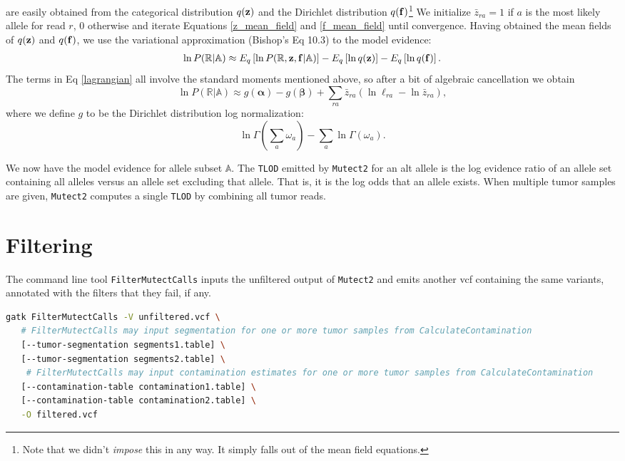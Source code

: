 \documentclass[nofootinbib,amssymb,amsmath]{revtex4}
\newcommand{\vf}{{\bf f}}
\newcommand{\vz}{{\bf z}}
\newcommand{\valpha}{{\bm{\alpha}}}
\newcommand{\vbeta}{{\bm{\beta}}}
\newcommand{\code}[1]{\texttt{#1}}
\begin{document}
are easily obtained from the categorical distribution $q(\vz)$ and the Dirichlet distribution $q(\vf)$\footnote{Note that we didn't \textit{impose} this in any way.  It simply falls out of the mean field equations.}  We initialize $\bar{z}_{ra} = 1$ if $a$ is the most likely allele for read $r$, 0 otherwise and iterate Equations \ref{z_mean_field} and \ref{f_mean_field} until convergence. Having obtained the mean fields of $q(\vz)$ and $q(\vf)$, we use the variational approximation (Bishop's Eq 10.3) to the model evidence:
\begin{align}
\ln P(\mathbb{R} | \mathbb{A}) \approx  E_q \left[ \ln P(\mathbb{R}, \vz, \vf | \mathbb{A}) \right] - E_q \left[ \ln q(\vz) \right] - E_q \left[ \ln q(\vf) \right]. \label{lagrangian}
\end{align}
The terms in Eq \ref{lagrangian} all involve the standard moments mentioned above, so after a bit of algebraic cancellation we obtain
\begin{equation}
\ln P(\mathbb{R} | \mathbb{A}) \approx g(\valpha) - g(\vbeta) +  \sum_{ra} \bar{z}_{ra} \left( \ln \ell_{ra} - \ln \bar{z}_{ra} \right),
\end{equation}
where we define $g$ to be the Dirichlet distribution log normalization:
\begin{equation}
\ln \Gamma(\sum_a \omega_a) - \sum_a \ln \Gamma(\omega_a).
\end{equation}

We now have the model evidence for allele subset $\mathbb{A}$. The \code{TLOD} emitted by \code{Mutect2} for an alt allele is the log evidence ratio of an allele set containing all alleles versus an allele set excluding that allele.  That is, it is the log odds that an allele exists.  When multiple tumor samples are given, \code{Mutect2} computes a single \code{TLOD} by combining all tumor reads.

\section{Filtering}
The command line tool \code{FilterMutectCalls} inputs the unfiltered output of \code{Mutect2} and emits another vcf containing the same variants, annotated with the filters that they fail, if any.

\begin{lstlisting}[language=bash,caption={Mutect2 command}, label={cmd-mutect2}]
gatk FilterMutectCalls -V unfiltered.vcf \
   # FilterMutectCalls may input segmentation for one or more tumor samples from CalculateContamination
   [--tumor-segmentation segments1.table] \
   [--tumor-segmentation segments2.table] \
    # FilterMutectCalls may input contamination estimates for one or more tumor samples from CalculateContamination
   [--contamination-table contamination1.table] \
   [--contamination-table contamination2.table] \
   -O filtered.vcf
\end{lstlisting}
\end{document}
